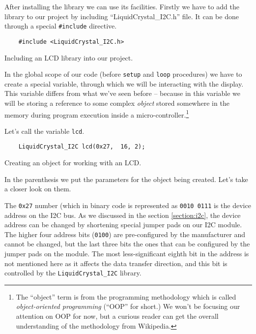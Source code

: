 \documentclass[../sparc.tex]{subfiles}
\begin{document}
After installing the library we can use its facilities.  Firstly we have to add
the library to our project by including ``LiquidCrystal\_I2C.h'' file.  It can
be done through a special \texttt{#include} directive.

\begin{listing}[ht]
  \begin{verbatim}
    #include <LiquidCrystal_I2C.h>
  \end{verbatim}
  \caption{Including an LCD library into our project.}
  \label{listing:game-dev-lcd-include}
\end{listing}

In the global scope of our code (before \texttt{setup} and
\texttt{loop} procedures) we have to create a special variable, through
which we will be interacting with the display.  This variable differs from what
we've seen before -- because in this variable we will be storing a reference to
some complex \emph{object} stored somewhere in the memory during program
execution inside a micro-controller.\footnote{The ``object'' term is from the
programming methodology which is called \emph{object-oriented programming}
(``OOP'' for short.)  We won't be focusing our attention on OOP for now, but a
curious reader can get the overall understanding of the methodology from
Wikipedia.}

Let's call the variable \texttt{lcd}.

\begin{listing}[ht]
  \begin{verbatim}
    LiquidCrystal_I2C lcd(0x27,  16, 2);
  \end{verbatim}
  \caption{Creating an object for working with an LCD.}
  \label{listing:game-dev-lcd-object}
\end{listing}

In the parenthesis we put the parameters for the object being created.  Let's
take a closer look on them.

The \texttt{0x27} number (which in binary code is represented as
\texttt{0010 0111} is the device address on the \gls{I2C} bus.  As we
discussed in the section \ref{section:i2c}, the device address can be changed by
shortening special jumper pads on our I2C module.  The higher four address bits
(\texttt{0100}) are pre-configured by the manufacturer and cannot be
changed, but the last three bits the ones that can be configured by the jumper
pads on the module.  The most less-significant eighth bit in the address is not
mentioned here as it affects the data transfer direction, and this bit is
controlled by the \texttt{LiquidCrystal_I2C} library.
\end{document}
